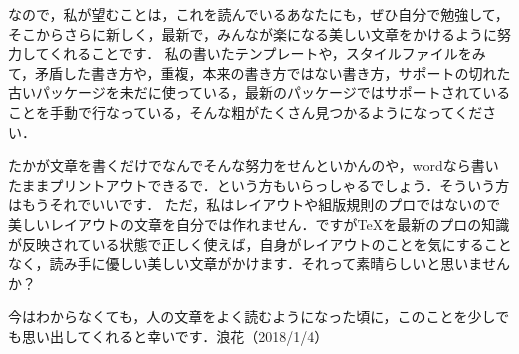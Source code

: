 \documentclass{jlreq}%
\numberwithin{equation}{section}%
\begin{document}
なので，私が望むことは，これを読んでいるあなたにも，ぜひ自分で勉強して，そこからさらに新しく，最新で，みんなが楽になる美しい文章をかけるように努力してくれることです．
私の書いたテンプレートや，スタイルファイルをみて，矛盾した書き方や，重複，本来の書き方ではない書き方，サポートの切れた古いパッケージを未だに使っている，最新のパッケージではサポートされていることを手動で行なっている，そんな粗がたくさん見つかるようになってください．

たかが文章を書くだけでなんでそんな努力をせんといかんのや，wordなら書いたままプリントアウトできるで．という方もいらっしゃるでしょう．そういう方はもうそれでいいです．
ただ，私はレイアウトや組版規則のプロではないので美しいレイアウトの文章を自分では作れません．ですが\TeX を最新のプロの知識が反映されている状態で正しく使えば，自身がレイアウトのことを気にすることなく，読み手に優しい美しい文章がかけます．それって素晴らしいと思いませんか？

今はわからなくても，人の文章をよく読むようになった頃に，このことを少しでも思い出してくれると幸いです．浪花（2018/1/4）



%
%
{\small

}

\clearpage
\end{document}
